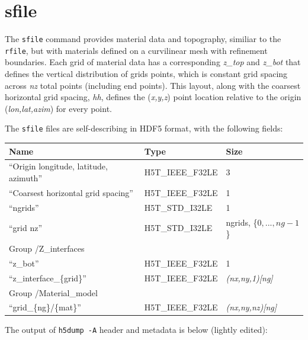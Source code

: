 \documentclass[11pt]{report}
\begin{document}
\section{sfile}\label{sec:sfile-format}

The \verb+sfile+ command provides material data and topography, 
  similiar to the \verb+rfile+, but with materials defined on
  a curvilinear mesh with refinement boundaries.
Each grid of material data has a corresponding {\em z\_top} and {\em z\_bot}
  that defines the vertical distribution of grids points, which is constant
  grid spacing across {\em nz} total points (including end points).
This layout, along with the coarsest horizontal grid spacing, {\em hh}, defines
  the ({\em x,y,z}) point location relative to the origin ({\em lon,lat,azim})
  for every point.

The \verb+sfile+ files are self-describing in HDF5 format, with
  the following fields:
\begin{center}
\begin{tabular}{lll}\hline
Name & Type & Size \\ \hline
  ``Origin longitude, latitude, azimuth'' & H5T\_IEEE\_F32LE & 3 \\ \hline
  ``Coarsest horizontal grid spacing'' & H5T\_IEEE\_F32LE & 1 \\ \hline
  ``ngrids'' & H5T\_STD\_I32LE & 1 \\ \hline
  ``grid nz'' & H5T\_STD\_I32LE & ngrids, \{$0,...,ng-1$\} \\ \hline
Group /Z\_interfaces \\ \hline
  ``z\_bot'' & H5T\_IEEE\_F32LE & 1 \\ \hline
  ``z\_interface\_\{grid\}'' & H5T\_IEEE\_F32LE & {\em (nx,ny,1)[ng]}  \\ \hline
Group /Material\_model \\ \hline
  ``grid\_\{ng\}/\{mat\}'' & H5T\_IEEE\_F32LE & {\em (nx,ny,nz)[ng]} \\ \hline
\end{tabular}
\end{center}

The output of {\tt h5dump -A} header and metadata is below (lightly edited):
\end{document}
